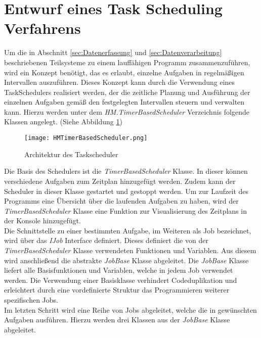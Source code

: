 \newpage
\section{Entwurf eines Task Scheduling Verfahrens}\label{sec:Gesamtkonzept}
Um die in Abschnitt \ref{sec:Datenerfassung} und \ref{sec:Datenverarbeitung} beschriebenen Teilsysteme zu einem lauffähigen Programm zusammenzuführen, wird ein Konzept benötigt, das es erlaubt, einzelne Aufgaben in regelmäßigen Intervallen auszuführen. Dieses Konzept kann durch die Verwendung eines TaskSchedulers realisiert werden, der die zeitliche Planung und Ausführung der einzelnen Aufgaben gemäß den festgelegten Intervallen steuern und verwalten kann. Hierzu werden unter dem \textit{HM.TimerBasedScheduler} Verzeichnis folgende Klassen angelegt. (Siehe Abbildung \ref{fig:TimerBasedScheduler}) 
\begin{center}
    \begin{figure}[h!]
        \centering
        \texttt{[image: HMTimerBasedScheduler.png]}
        \caption{Architektur des Taskscheduler}
        \label{fig:TimerBasedScheduler}
    \end{figure}
\end{center}
Die Basis des Schedulers ist die \textit{TimerBasedScheduler} Klasse. In dieser können verschiedene Aufgaben zum Zeitplan hinzugefügt werden. Zudem kann der Scheduler in dieser Klasse gestartet und gestoppt werden. Um zur Laufzeit des Programms eine Übersicht über die laufenden Aufgaben zu haben, wird der \textit{TimerBasedScheduler} Klasse eine Funktion zur Visualisierung des Zeitplans in der Konsole hinzugefügt.\\
Die Schnittstelle zu einer bestimmten Aufgabe, im Weiteren als Job bezeichnet, wird über das \textit{IJob} Interface definiert. Dieses definiert die von der \textit{TimerBasedScheduler} Klasse verwendeten Funktionen und Variablen. Aus diesem wird anschließend die abstrakte \textit{JobBase} Klasse abgeleitet. Die \textit{JobBase} Klasse liefert alle Basisfunktionen und Variablen, welche in jedem Job verwendet werden. Die Verwendung einer Basisklasse verhindert Codeduplikation und erleichtert durch eine vordefinierte Struktur das Programmieren weiterer spezifischen Jobs.\\
Im letzten Schritt wird eine Reihe von Jobs abgeleitet, welche die in gewünschten Aufgaben ausführen. Hierzu werden drei Klassen aus der \textit{JobBase} Klasse abgeleitet.
